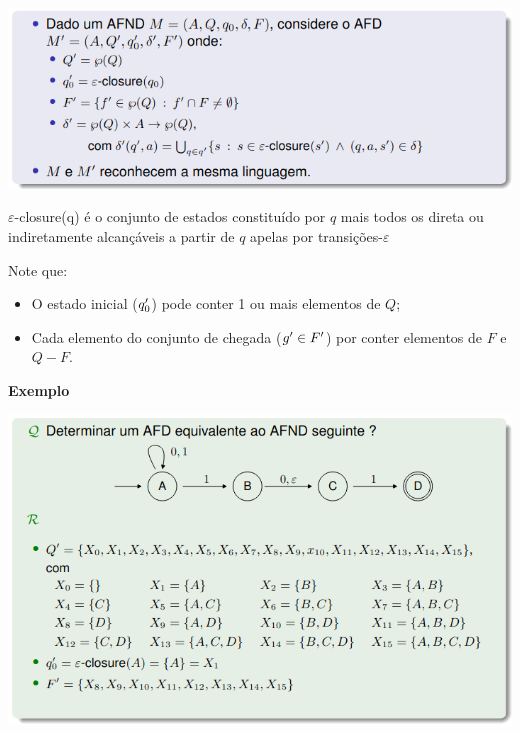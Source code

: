 \documentclass{article}
\begin{document}
\begin{flushleft}
  \begin{center}
    \includegraphics[scale=0.4]{54}
  \end{center}

  \item $\varepsilon$-closure(q) é o conjunto de estados constituído por $q$ mais todos os direta ou
  indiretamente alcançáveis a partir de $q$ apelas por transições-$\varepsilon$
  \item Note que:
  \begin{itemize}
    \item O estado inicial ($q_0\rq$) pode conter 1 ou mais elementos de $Q$;
    \item Cada elemento do conjunto de chegada ($g\rq \in F\rq$) por conter elementos de $F$ e $Q - F$.
  \end{itemize}

  \vspace{5mm}

  \textbf{Exemplo}

  \begin{center}
    \includegraphics[scale=0.4]{55}
  \end{center}


\end{flushleft}
\end{document}

